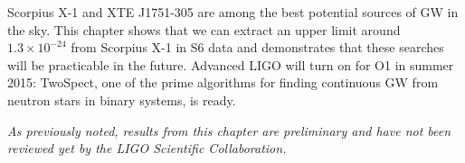 Scorpius X-1 and XTE J1751-305 are among the best potential sources of GW in the sky.
This chapter shows that we can extract an upper limit around $1.3\times10^{-24}$ from Scorpius X-1 in S6 data and demonstrates that these searches will be practicable in the future.
Advanced LIGO will turn on for O1 in summer 2015: TwoSpect, one of the prime algorithms for finding continuous GW from neutron stars in binary systems, is ready.

\textit{As previously noted, results from this chapter are preliminary and have not been reviewed yet by the LIGO Scientific Collaboration.}





